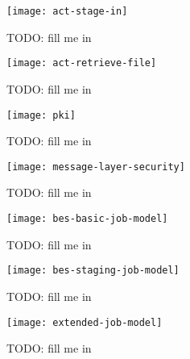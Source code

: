 \begin{figure}[h]
  \begin{center}
    \texttt{[image: act-stage-in]}
  \end{center}
  \caption[Stage-In Activity]{TODO: fill me in}
  \label{fig:act-stage-in}
\end{figure}

\begin{figure}[h]
  \begin{center}
    \texttt{[image: act-retrieve-file]}
  \end{center}
  \caption[File Retrieval Activity]{TODO: fill me in}
  \label{fig:act-retrieve-file}
\end{figure}

\begin{figure}[h]
  \begin{center}
    \texttt{[image: pki]}
  \end{center}
  \caption[Public Key Infrastructure]{TODO: fill me in}
  \label{fig:net-pki}
\end{figure}

\begin{figure}[h]
  \begin{center}
    \texttt{[image: message-layer-security]}
  \end{center}
  \caption[Message Layer Security]{TODO: fill me in}
  \label{fig:net-mls}
\end{figure}

\begin{figure}[h]
  \begin{center}
    \texttt{[image: bes-basic-job-model]}
  \end{center}
  \caption[BES Basic State Model]{TODO: fill me in}
  \label{fig:bes-basic}
\end{figure}

\begin{figure}[h]
  \begin{center}
    \texttt{[image: bes-staging-job-model]}
  \end{center}
  \caption[BES State Model Staging Extension]{TODO: fill me in}
  \label{fig:bes-staging}
\end{figure}

\begin{figure}[h]
  \begin{center}
    \texttt{[image: extended-job-model]}
  \end{center}
  \caption[Job Model (extended)]{TODO: fill me in}
  \label{fig:bes-extended}
\end{figure}

